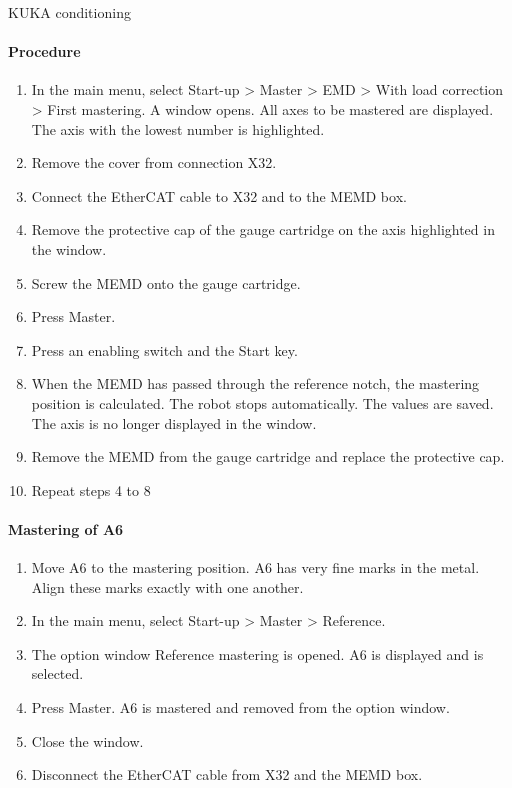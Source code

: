 \documentclass{book}
\begin{document}
\begin{chapter}{KUKA conditioning}
		\paragraph{Procedure}
		\begin{enumerate}
			\item In the main menu, select Start-up > Master > EMD > With load correction > First mastering. A window opens. All axes to be mastered are displayed. The axis with the lowest number is highlighted.
			\item Remove the cover from connection X32.
			\item Connect the EtherCAT cable to X32 and to the MEMD box.
			\item Remove the protective cap of the gauge cartridge on the axis highlighted in the window.
			\item Screw the MEMD onto the gauge cartridge.
			\item Press Master.
			\item Press an enabling switch and the Start key.
			\item When the MEMD has passed through the reference notch, the mastering position is calculated. The robot stops automatically. The values are saved. The axis is no longer displayed in the window.
			\item Remove the MEMD from the gauge cartridge and replace the protective cap.
			\item Repeat steps 4 to 8 
		\end{enumerate}
	
		\paragraph{Mastering of A6}
		\begin{enumerate}
			\item Move A6 to the mastering position. A6 has very fine marks in the metal. Align these marks exactly with one another.
			\item In the main menu, select Start-up > Master > Reference.
			\item The option window Reference mastering is opened. A6 is displayed and is selected.
			\item Press Master. A6 is mastered and removed from the option window.
			\item Close the window.
			\item Disconnect the EtherCAT cable from X32 and the MEMD box.
		\end{enumerate}
		

\end{chapter}
\end{document}
